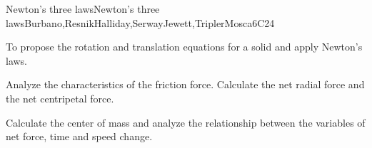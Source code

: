 \begin{syllabus}
\begin{unit}{Newton's three laws}{Newton's three laws}{Burbano,ResnikHalliday,SerwayJewett,TriplerMosca}{6}{C24}
      \begin{learningoutcomes}
         \item To propose the rotation and translation equations for a solid and apply Newton's laws. 
         \item Analyze the characteristics of the friction force. Calculate the net radial force and the net centripetal force.
         \item Calculate the center of mass and analyze the relationship between the variables of net force, time and speed change. 
      \end{learningoutcomes}
   \end{unit}

\begin{coursebibliography}
\end{coursebibliography}

\end{syllabus}

